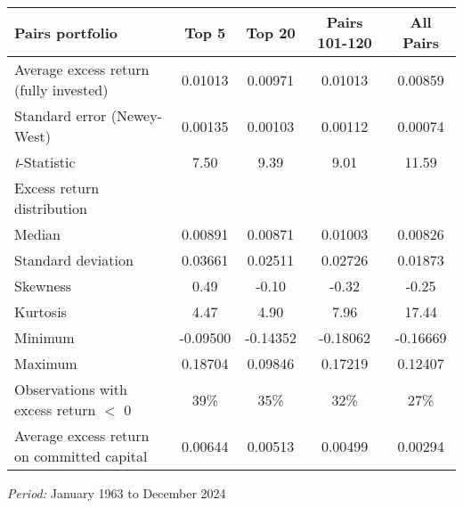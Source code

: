 \begin{table}[H]
\centering
\label{tab:excess_returns}
\footnotesize
\begin{tabular}{lcccc}
\toprule
Pairs portfolio & Top 5 & Top 20 & Pairs 101-120 & All Pairs \\
\midrule
Average excess return (fully invested) & 0.01013 & 0.00971 & 0.01013 & 0.00859 \\
Standard error (Newey-West) & 0.00135 & 0.00103 & 0.00112 & 0.00074 \\
\textit{t}-Statistic & 7.50 & 9.39 & 9.01 & 11.59 \\
Excess return distribution & & & & \\
\quad Median & 0.00891 & 0.00871 & 0.01003 & 0.00826 \\
\quad Standard deviation & 0.03661 & 0.02511 & 0.02726 & 0.01873 \\
\quad Skewness & 0.49 & -0.10 & -0.32 & -0.25 \\
\quad Kurtosis & 4.47 & 4.90 & 7.96 & 17.44 \\
\quad Minimum & -0.09500 & -0.14352 & -0.18062 & -0.16669 \\
\quad Maximum & 0.18704 & 0.09846 & 0.17219 & 0.12407 \\
\quad Observations with excess return $<$ 0 & 39\% & 35\% & 32\% & 27\% \\
Average excess return on committed capital & 0.00644 & 0.00513 & 0.00499 & 0.00294 \\
\bottomrule
\end{tabular}

\medskip 
\textit{Period:} January 1963 to December 2024
\end{table}